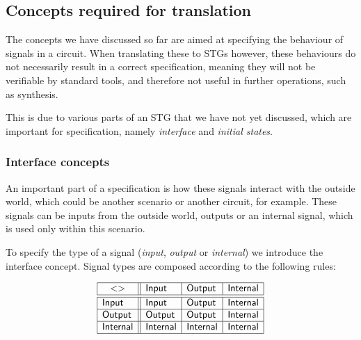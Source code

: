\documentclass[british,conference,compsoc]{IEEEtran}
\begin{document}
\subsection{Concepts required for translation\label{sub:trans-concepts}}

\vspace{-2mm}

The concepts we have discussed so far are aimed at specifying the behaviour of 
signals in a circuit. When translating these to STGs however, these behaviours 
do not necessarily result in a correct specification, meaning they will not be 
verifiable by standard tools, and therefore not useful in further operations, 
such as synthesis.

This is due to various parts of an STG that we have not yet discussed, which 
are important for specification, namely \emph{interface} and 
\emph{initial states}.

\vspace{-3mm}

\subsubsection{Interface concepts\label{sub:interface}} 

An important part of a specification is how these signals interact with the 
outside world, which could be another scenario or another circuit, for example.
These signals can be inputs from the outside world, outputs or an internal 
signal, which is used only within this scenario. 

To specify the type of a signal (\emph{input},
\emph{output} or \emph{internal}) we introduce the \textsf{interface} concept.
Signal types are composed according to the following rules:

\vspace{-2mm}

\[
\begin{array}{|l||l|l|l|}
\hline
\multicolumn{1}{|c||}{<>} & \mathsf{Input} & \mathsf{Output} &
\mathsf{Internal} \\ \hline \hline
\mathsf{Input} & \mathsf{Input} & \mathsf{Output} & \mathsf{Internal} \\ \hline
\mathsf{Output} & \mathsf{Output} & \mathsf{Output} & \mathsf{Internal} \\
\hline
\mathsf{Internal}& \mathsf{Internal} & \mathsf{Internal} & \mathsf{Internal} \\
\hline
\end{array}
\]
\end{document}
